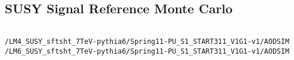 \subsection*{SUSY Signal Reference Monte Carlo}
\fontsize{10}{12}
\begin{verbatim}

/LM4_SUSY_sftsht_7TeV-pythia6/Spring11-PU_S1_START311_V1G1-v1/AODSIM
/LM6_SUSY_sftsht_7TeV-pythia6/Spring11-PU_S1_START311_V1G1-v1/AODSIM
\end{verbatim}
\normalsize

